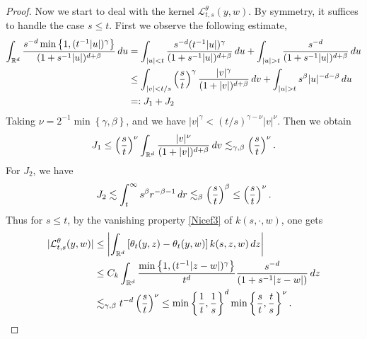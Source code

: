 \documentclass[oneside,english,a4wide]{amsart}
\numberwithin{equation}{section}
\numberwithin{figure}{section}
\theoremstyle{plain}
\theoremstyle{plain}
\theoremstyle{definition}
\theoremstyle{plain}
\theoremstyle{remark}
\theoremstyle{definition}
\theoremstyle{remark}
\theoremstyle{definition}
\newcommand{\real}{{\mathbb R}}
\renewcommand{\L}{{\mathcal L}}
\newcommand{\8}{+\infty}
\renewcommand{\1}{\mathbbm{1}}
\newcommand\jdz[1]{ \left| #1 \right| }
\newcommand\sk[1]{ \left( #1 \right) }
\newcommand\mk[1]{ \left[ #1 \right] }
\newcommand\lk[1]{ \left\{ #1 \right\} }
\renewcommand\d{{\rm d}}
\begin{document}
{\begin{proof}
    Now we start to deal with the kernel $\L^\theta_{t, s}(y, w)$. By symmetry, it suffices to handle the case $s \leq t$. First we observe the following estimate,
    \[
    \begin{aligned}
        \int_{\real^d} \frac{ s^{-d} \min\lk{ 1, (t^{-1}|u|)^{\gamma} } }{ (1 + s^{-1}|u|)^{d + \beta} }\, \d u & = \int_{|u| < t} \frac{ s^{-d}  (t^{-1}|u|)^{\gamma} }{ (1 + s^{-1}|u|)^{d + \beta} }\, \d u + \int_{|u| > t} \frac{ s^{-d} }{ (1 + s^{-1}|u|)^{d + \beta} }\, \d u \\
        & \leq \int_{|v| < t/s} \sk{\frac{s}{t}}^\gamma\frac{  |v|^{\gamma} }{ (1 + |v|)^{d + \beta} }\, \d v + \int_{|u| > t} s^{\beta}|u|^{-d-\beta}\, \d u \\
        & =: J_1 + J_2
    \end{aligned}
    \]
    Taking $\nu = 2^{-1}\min\lk{\gamma, \beta}$, and we have $|v|^\gamma < (t/s)^{\gamma - \nu}|v|^\nu $. Then we obtain
    \[
        J_1 \leq \sk{ \frac{s}{t} }^{\nu} \int_{\real^d} \frac{  |v|^{\nu} }{ (1 + |v|)^{d + \beta} }\, \d v \lesssim_{\gamma, \beta} \sk{ \frac{s}{t} }^{\nu}.
    \]
    For $J_2$, we have
    \[
        J_2 \lesssim \int_{t}^{\infty} s^\beta r^{-\beta - 1}\,\d r \lesssim_{\beta} \sk{ \frac{s}{t} }^{\beta} \leq \sk{ \frac{s}{t} }^{\nu}. 
    \]
    Thus for $s \leq t$, by the vanishing property \eqref{Nicef3}  of $k(s,\cdot,w)$, one gets
     \[
    \begin{aligned}
        |\L^\theta_{t, s}(y, w)| & \leq \jdz{ \int_{\real^d}\mk{\theta_t(y, z) - \theta_t(y, w)}k(s, z, w) \, \d z } \\
        & \leq C_k \int_{\real^d} \frac{ \min\lk{ 1, (t^{-1}|z-w|)^{\gamma} } }{t^d}\frac{s^{-d}}{ (1 + s^{-1}|z - w|) } \, \d z \\
        & \lesssim_{\gamma, \beta} t^{-d} \sk{ \frac{s}{t} }^{\nu } \leq \min\lk{ \frac{1}{t}, \frac{1}{s} }^d\min\lk{ \frac{s}{t}, \frac{t}{s} }^{ \nu }.
    \end{aligned}
    \]

\end{proof}}
\end{document}
